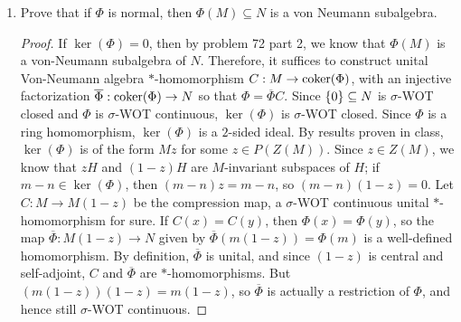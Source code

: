 \documentclass[a4paper,10pt]{report}
\DeclarePairedDelimiter{\set}{\{}{\}}
\newcommand{\ol}[1]{\overline{#1}}
\begin{document}
\begin{enumerate}
\begin{enumerate}
\begin{proof}
			On the other hand, suppose that $\Phi:M\to N$ is normal. Let $\psi\in N_*$, the dual of $N$ under the $\sigma$-WOT topology, be positive. Since $\psi$ is $\sigma$-WOT continuous, $\psi$ is normal, so $\psi \circ \Phi$ is normal and positive, and hence $\sigma$-WOT continuous by problem 88. Since $M_*$ is spanned by positive linear functionals (Corollary 4.3.4 of Jesse Peterson's notes), %
				this shows that $\psi \circ \Phi$ is $\sigma$-WOT continuous for every $\psi\in N_*$. Since the $\sigma$-WOT topology is the weak topology induced by the predual, this is precisely the condition for $\Phi$ to be $\sigma$-WOT continuous. 
				\end{proof}
			\item Prove that if $\Phi$ is normal, then $\Phi(M) \subseteq N$ is a von Neumann subalgebra.
			\begin{proof} If $\ker(\Phi)=0$, then by problem 72 part 2, we know that $\Phi(M)$ is a von-Neumann subalgebra of $N$. Therefore, it suffices to construct  unital Von-Neumann algebra $*$-homomorphism $C:M\to\operatorname{coker}(\Phi)$, with an injective factorization $\ol{\Phi}:\coker(\Phi)\to N$ so that $\Phi=\ol{\Phi}C$. Since $\set{0}\subseteq N$ is $\sigma$-WOT closed and $\Phi$ is $\sigma$-WOT continuous, $\ker(\Phi)$ is $\sigma$-WOT closed. Since $\Phi$ is a ring homomorphism, $\ker(\Phi)$ is a $2$-sided ideal. By results proven in class, $\ker(\Phi)$ is of the form $Mz$ for some $z\in P(Z(M))$. Since $z\in Z(M)$, we know that $zH$ and $(1-z)H$ are $M$-invariant subspaces of $H$; if $m-n\in\ker(\Phi)$, then $(m-n)z=m-n$, so $(m-n)(1-z)=0$. Let $C:M\to M(1-z)$ be the compression map, a $\sigma$-WOT continuous unital $*$-homomorphism for sure. If $C(x)=C(y)$, then $\Phi(x)=\Phi(y)$, so the map $\ol{\Phi}:M(1-z)\to N$ given by $\ol{\Phi}(m(1-z))=\Phi(m)$ is a well-defined homomorphism. By definition, $\ol{\Phi}$ is unital, and since $(1-z)$ is central and self-adjoint, $C$ and $\ol{\Phi}$ are $*$-homomorphisms. But $(m(1-z))(1-z)=m(1-z)$, so $\ol{\Phi}$ is actually a restriction of $\Phi$, and hence still $\sigma$-WOT continuous. 


\end{proof}
\end{enumerate}
\end{enumerate}
\end{document}
